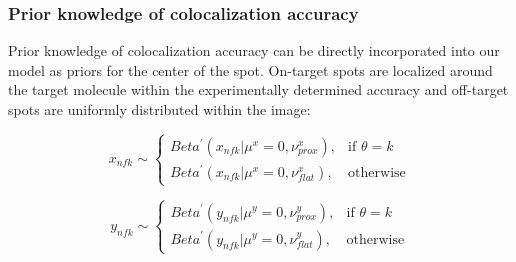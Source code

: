 \subsubsection{Prior knowledge of colocalization accuracy}

Prior knowledge of colocalization accuracy can be directly incorporated into our model as priors for the center of the spot. On-target spots are localized around the target molecule within the experimentally determined accuracy and off-target spots are uniformly distributed within the image:

\begin{equation*}
    x_{nfk} \sim
\begin{cases}
    Beta^{\prime}(x_{nfk}|\mu^x=0,\nu^x_{prox}),& \text{if } \theta = k\\
    Beta^{\prime}(x_{nfk}|\mu^x=0,\nu^x_{flat}),& \text{otherwise}
\end{cases}
\end{equation*}

\begin{equation*}
    y_{nfk} \sim
\begin{cases}
    Beta^{\prime}(y_{nfk}|\mu^y=0,\nu^y_{prox}),& \text{if } \theta = k\\
    Beta^{\prime}(y_{nfk}|\mu^y=0,\nu^y_{flat}),& \text{otherwise}
\end{cases}
\end{equation*}







